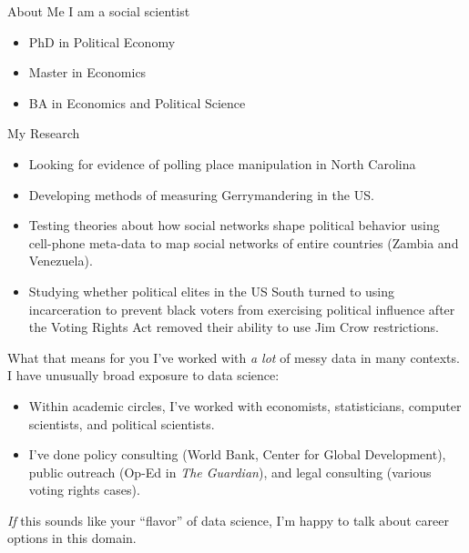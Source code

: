 \documentclass[11pt]{beamer}
\begin{document}
\begin{frame}[c]{About Me}
	I am a social scientist \\
	\vspace{0.5cm}
	\begin{itemize}
		\pause \item PhD in Political Economy
		\pause \item Master in Economics
		\pause \item BA in Economics and Political Science
	\end{itemize}
\end{frame}

\begin{frame}[c]{My Research}
	\begin{itemize}
		\pause \item Looking for evidence of polling place manipulation in North Carolina
		\pause \item Developing methods of measuring Gerrymandering in the US.
		\pause \item Testing theories about how social networks shape political behavior using cell-phone meta-data to map social networks of entire countries (Zambia and Venezuela).
		\pause \item Studying whether political elites in the US South turned to using incarceration to prevent black voters from exercising political influence after the Voting Rights Act removed their ability to use Jim Crow restrictions.
	\end{itemize}
\end{frame}

\begin{frame}[c]{What that means for you}
\pause I've worked with \emph{a lot} of messy data in many contexts. \\
\pause I have unusually broad exposure to data science:
\begin{itemize}
	\pause \item Within academic circles, I've worked with economists, statisticians, computer scientists, and political scientists.
	\pause \item I've done \alert{policy consulting} (World Bank, Center for Global Development), \alert{public outreach} (Op-Ed in \emph{The Guardian}), and \alert{legal consulting} (various voting rights cases).
\end{itemize}
\pause \emph{If} this sounds like your ``flavor'' of data science, I'm happy to talk about career options in this domain.
\end{frame}
\end{document}
